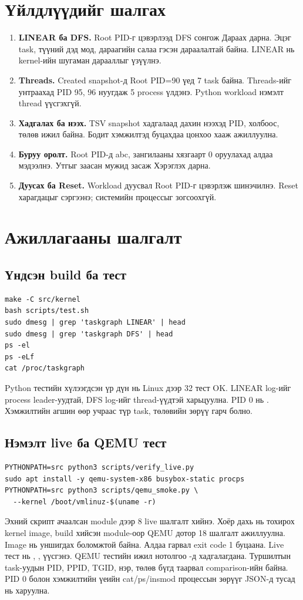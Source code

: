 \section{Үйлдлүүдийг шалгах}
\begin{enumerate}
\item \textbf{LINEAR ба DFS.} Root PID-г цэвэрлээд DFS сонгож Дараах дарна. Эцэг task, түүний дэд мод, дараагийн салаа гэсэн дараалалтай байна. LINEAR нь kernel-ийн шугаман дарааллыг үзүүлнэ.
\item \textbf{Threads.} Created snapshot-д Root PID=90 үед 7 task байна. Threads-ийг унтраахад PID 95, 96 нуугдаж 5 process үлдэнэ. Python workload нэмэлт thread үүсгэхгүй.
\item \textbf{Хадгалах ба нээх.} TSV snapshot хадгалаад дахин нээхэд PID, холбоос, төлөв ижил байна. Бодит хэмжилтэд буцахдаа цонхоо хааж  ажиллуулна.
\item \textbf{Буруу оролт.} Root PID-д abc, зангилааны хязгаарт 0 оруулахад алдаа мэдээлнэ. Утгыг заасан мужид засаж Хэрэглэх дарна.
\item \textbf{Дуусах ба Reset.} Workload дуусвал Root PID-г цэвэрлэж шинэчилнэ. Reset харагдацыг сэргээнэ; системийн процессыг зогсоохгүй.
\end{enumerate}

\clearpage
\section{Ажиллагааны шалгалт}
\subsection{Үндсэн build ба тест}
\begin{lstlisting}
make -C src/kernel
bash scripts/test.sh
sudo dmesg | grep 'taskgraph LINEAR' | head
sudo dmesg | grep 'taskgraph DFS' | head
ps -el
ps -eLf
cat /proc/taskgraph
\end{lstlisting}
Python тестийн хүлээгдсэн үр дүн нь Linux дээр 32 тест OK. LINEAR log-ийг process leader-уудтай, DFS log-ийг thread-үүдтэй харьцуулна. PID 0 нь . Хэмжилтийн агшин өөр учраас түр task, төлөвийн зөрүү гарч болно.
\subsection{Нэмэлт live ба QEMU тест}
\begin{lstlisting}
PYTHONPATH=src python3 scripts/verify_live.py
sudo apt install -y qemu-system-x86 busybox-static procps
PYTHONPATH=src python3 scripts/qemu_smoke.py \
  --kernel /boot/vmlinuz-$(uname -r)
\end{lstlisting}
Эхний скрипт ачаалсан module дээр 8 live шалгалт хийнэ. Хоёр дахь нь тохирох kernel image, build хийсэн module-оор QEMU дотор 18 шалгалт ажиллуулна. Image нь уншигдах боломжтой байна. Алдаа гарвал exit code 1 буцаана. Live тест нь , ,  үүсгэнэ. QEMU тестийн ижил нотолгоо -д хадгалагдана. Туршилтын task-уудын PID, PPID, TGID, нэр, төлөв бүгд таарвал comparison-ийн  байна. PID 0 болон хэмжилтийн үеийн cat/ps/insmod процессын зөрүүг JSON-д тусад нь харуулна.

